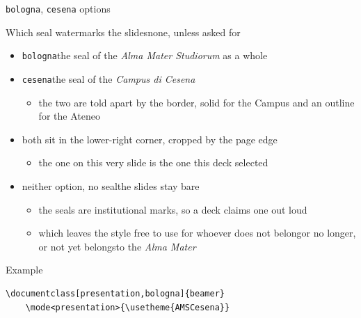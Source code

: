 \begin{frame}[c,fragile]{\texttt{bologna}, \texttt{cesena} options}
%
\begin{alertblock}{Which seal watermarks the slides\textemdash{}none, unless asked for}
\begin{itemize}
	\item \texttt{bologna}\textemdash{}the seal of the \emph{Alma Mater Studiorum} as a whole
	\item \texttt{cesena}\textemdash{}the seal of the \emph{Campus di Cesena}
	\begin{itemize}
		\item the two are told apart by the border, solid for the Campus and an outline for the Ateneo
	\end{itemize}
	\item both sit in the lower-right corner, cropped by the page edge
	\begin{itemize}
		\item the one on this very slide is the one this deck selected
	\end{itemize}
	\item \alert{neither option, no seal}\textemdash{}the slides stay bare
	\begin{itemize}
		\item the seals are institutional marks, so a deck claims one out loud
		\item which leaves the style free to use for whoever does not belong\textemdash{}or no longer, or not yet belongs\textemdash{}to the \emph{Alma Mater}
	\end{itemize}
\end{itemize}
\end{alertblock}
%
\begin{exampleblock}{Example}
{\scriptsize\begin{verbatim}
\documentclass[presentation,bologna]{beamer}
    \mode<presentation>{\usetheme{AMSCesena}}
\end{verbatim}} %
\end{exampleblock}
%
\end{frame}
